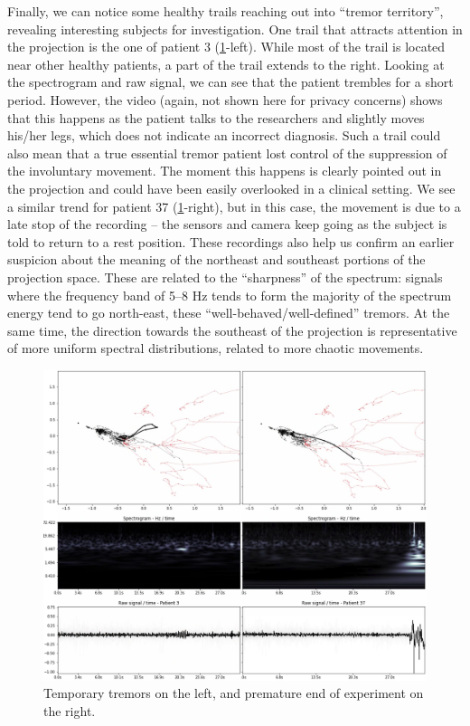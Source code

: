 Finally, we can notice some healthy trails reaching out into ``tremor territory'', revealing interesting subjects for investigation. One trail that attracts attention in the projection is the one of patient 3 (\cref{fig:exp1-337}-left). While most of the trail is located near other healthy patients, a part of the trail extends to the right. Looking at the spectrogram and raw signal, we can see that the patient trembles for a short period. However, the video (again, not shown here for privacy concerns) shows that this happens as the patient talks to the researchers and slightly moves his/her legs, which does not indicate an incorrect diagnosis.
Such a trail could also mean that a true essential tremor patient lost control of the suppression of the involuntary movement. The moment this happens is clearly pointed out in the projection and could have been easily overlooked in a clinical setting. We see a similar trend for patient 37 (\cref{fig:exp1-337}-right), but in this case, the movement is due to a late stop of the recording -- the sensors and camera keep going as the subject is told to return to a rest position. These recordings also help us confirm an earlier suspicion about the meaning of the northeast and southeast portions of the projection space. These are related to the ``sharpness'' of the spectrum: signals where the frequency band of 5--8 Hz tends to form the majority of the spectrum energy tend to go north-east, these ``well-behaved/well-defined'' tremors. At the same time, the direction towards the southeast of the projection is representative of more uniform spectral distributions, related to more chaotic movements.

\begin{figure}[ht]
\centering
\includegraphics[width=\linewidth]{figures/nemo/exp1-337.png}
\caption{Temporary tremors on the left, and premature end of experiment on the right.}
\label{fig:exp1-337}
\end{figure}


